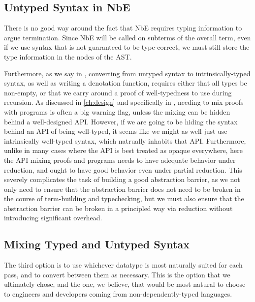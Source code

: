 \subsection{Untyped Syntax in NbE}\label{sec:rewriting-more:AST:untyped-nbe}
There is no good way around the fact that NbE requires typing information to argue termination.
Since NbE will be called on subterms of the overall term, even if we use syntax that is not guaranteed to be type-correct, we must still store the type information in the nodes of the AST.

Furthermore, as we say in , converting from untyped syntax to intrinsically-typed syntax, as well as writing a denotation function, requires either that all types be non-empty, or that we carry around a proof of well-typedness to use during recursion.
As discussed in \autoref{ch:design} and specifically in , needing to mix proofs with programs is often a big warning flag, unless the mixing can be hidden behind a well-designed API.
However, if we are going to be hiding the syntax behind an API of being well-typed, it seems like we might as well just use intrinsically well-typed syntax, which natrually inhabits that API.
Furthermore, unlike in many cases where the API is best treated as opaque everywhere, here the API mixing proofs and programs needs to have adequate behavior under reduction, and ought to have good behavior even under partial reduction.
This severely complicates the task of building a good abstraction barrier, as we not only need to ensure that the abstraction barrier does not need to be broken in the course of term-building and typechecking, but we must also ensure that the abstraction barrier can be broken in a principled way via reduction without introducing significant overhead.


\subsection{Mixing Typed and Untyped Syntax}\label{sec:rewriting-more:AST:both}
The third option is to use whichever datatype is most naturally suited for each pass, and to convert between them as necessary.
This is the option that we ultimately chose, and the one, we believe, that would be most natural to choose to engineers and developers coming from non-dependently-typed languages.

